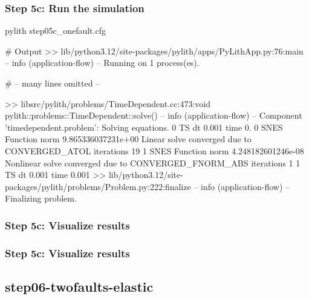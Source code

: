 \documentclass[aspectratio=169]{beamer}
\begin{document}
\begin{frame}[fragile]
  \frametitle{Step 5c: Run the simulation}
  \summary{}

\begin{pyrejournal}
pylith step05c_onefault.cfg

# Output
 >> lib/python3.12/site-packages/pylith/apps/PyLithApp.py:76:main
 -- info (application-flow)
 -- Running on 1 process(es).

# -- many lines omitted --

 >> libsrc/pylith/problems/TimeDependent.cc:473:void pylith::problems::TimeDependent::solve()
 -- info (application-flow)
 -- Component 'timedependent.problem': Solving equations.
0 TS dt 0.001 time 0.
    0 SNES Function norm 9.865336037231e+00
      Linear solve converged due to CONVERGED_ATOL iterations 19
    1 SNES Function norm 4.248182601246e-08
    Nonlinear solve converged due to CONVERGED_FNORM_ABS iterations 1
1 TS dt 0.001 time 0.001
 >> lib/python3.12/site-packages/pylith/problems/Problem.py:222:finalize
 -- info (application-flow)
 -- Finalizing problem.
\end{pyrejournal}
  
\end{frame}


\begin{frame}
  \frametitle{Step 5c: Visualize results}

    
\end{frame}


\begin{frame}
  \frametitle{Step 5c: Visualize results}

    
\end{frame}


\subsection{step06-twofaults-elastic}
\end{document}
